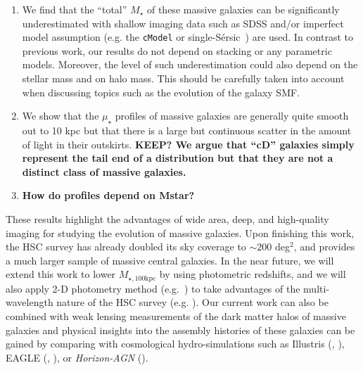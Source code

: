 \documentclass[a4paper,fleqn,usenatbib]{mnras}
\def\ser{{S\'{e}rsic\ }}
\def\mstar{{$M_{\star}$}}
\def\mtot{{$M_{\star,100\mathrm{kpc}}$}}
\def\mden{{$\mu_{\star}$}}
\begin{document}
    \begin{enumerate}
        \item We find that the ``total'' \mstar{} of these massive galaxies can be 
            significantly underestimated with shallow imaging data such as SDSS and/or 
            imperfect model assumption (e.g. the \texttt{cModel} or single-\ser{}) 
            are used. 
            In contrast to previous work, our results do not depend on stacking or any 
            parametric models. 
            Moreover, the level of such underestimation could also depend on the 
            stellar mass and on halo mass. 
            This should be carefully taken into account when discussing topics such 
            as the evolution of the galaxy SMF.
            
        \item We show that the \mden{} profiles of massive galaxies are generally quite 
            smooth out to 10 kpc but that there is a large but continuous scatter in the 
            amount of light in their outskirts. 
            {\bf KEEP? We argue that ``cD'' galaxies simply represent the tail end of a 
            distribution but that they are not a distinct class of massive galaxies.}
            
        \item {\bf How do profiles depend on Mstar?}
            
    \end{enumerate}

    These results highlight the advantages of wide area, deep, and high-quality imaging 
    for studying the evolution of massive galaxies. 
    Upon finishing this work, the HSC survey has already doubled its sky coverage to 
    ${\sim} 200$ deg$^2$, and provides a much larger sample of massive central galaxies. 
    In the near future, we will extend this work to lower \mtot{} by using photometric 
    redshifts, and we will also apply 2-D photometry method (e.g.\ \citealt{Huang2013a}) 
    to take advantages of the multi-wavelength nature of the HSC survey 
    (e.g. \citealt{Huang2016}). 
    Our current work can also be combined with weak lensing measurements of the dark 
    matter halos of massive galaxies and physical insights into the assembly histories 
    of these galaxies can be gained by comparing with cosmological hydro-simulations 
    such as Illustris (\citealt{Vogelsberger2014}, \citealt{Genel2014}), 
    EAGLE (\citealt{Schaye2015}, \citealt{Crain2015}), or \textit{Horizon-AGN} 
    (\citealt{Dubois2014}).
\end{document}
